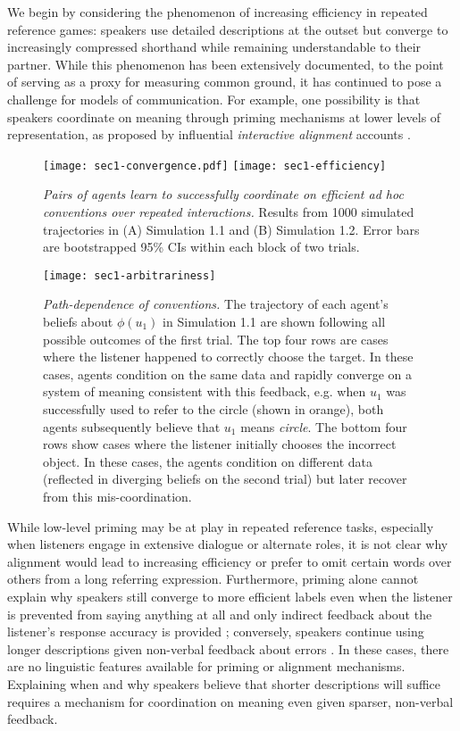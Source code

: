 We begin by considering the phenomenon of increasing efficiency in repeated reference games: speakers use detailed descriptions at the outset but converge to increasingly compressed shorthand while remaining understandable to their partner.
While this phenomenon has been extensively documented, to the point of serving as a proxy for measuring common ground, it has continued to pose a challenge for models of communication.
For example, one possibility is that speakers coordinate on meaning through priming mechanisms at lower levels of representation, as proposed by influential  \emph{interactive alignment} accounts \cite{pickering2004toward, pickering2006alignment, garrod2009joint}.


\begin{figure*}[b]
\centering
    \texttt{[image: sec1-convergence.pdf]}
        \texttt{[image: sec1-efficiency]}
  \caption{\emph{Pairs of agents learn to successfully coordinate on efficient ad hoc conventions over repeated interactions.} Results from 1000 simulated trajectories in (A) Simulation 1.1 and (B) Simulation 1.2. Error bars are bootstrapped 95\% CIs within each block of two trials.}
  \label{fig:sec1model}
\end{figure*}

  \begin{figure*}
\centering
    \texttt{[image: sec1-arbitrariness]}
    \vspace{1em}
  \caption{\emph{Path-dependence of conventions.} The trajectory of each agent's beliefs about $\phi(u_1)$ in Simulation 1.1 are shown following all possible outcomes of the first trial. The top four rows are cases where the listener happened to correctly choose the target. In these cases, agents condition on the same data and rapidly converge on a system of meaning consistent with this feedback, e.g. when $u_1$ was successfully used to refer to the circle (shown in orange), both agents subsequently believe that $u_1$ means \emph{circle}. The bottom four rows show cases where the listener initially chooses the incorrect object. In these cases, the agents condition on different data (reflected in diverging beliefs on the second trial) but later recover from this mis-coordination.}
  \label{fig:path-dependence}
\end{figure*}


While low-level priming may be at play in repeated reference tasks, especially when listeners engage in extensive dialogue or alternate roles, it is not clear why alignment would lead to increasing efficiency or prefer to omit certain words over others from a long referring expression.
Furthermore, priming alone cannot explain why speakers still converge to more efficient labels even when the listener is prevented from saying anything at all and only indirect feedback about the listener's response accuracy is provided \cite{KraussWeinheimer66_Tangrams}; conversely, speakers continue using longer descriptions given non-verbal feedback about errors \cite{hawkins2020characterizing}.
In these cases, there are no linguistic features available for priming or alignment mechanisms.
Explaining when and why speakers believe that shorter descriptions will suffice requires a mechanism for coordination on meaning even given sparser, non-verbal feedback.

